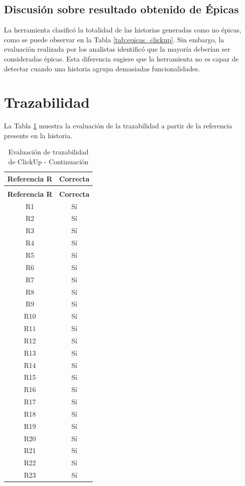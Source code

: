 \subsection{Discusión sobre resultado obtenido de Épicas}
La herramienta clasificó la totalidad de las historias generadas como no épicas, como se puede observar en la Tabla \ref{tab:epicas_clickup}. Sin embargo, la evaluación realizada por los analistas identificó que la mayoría deberían ser consideradas épicas. Esta diferencia sugiere que la herramienta no es capaz de detectar cuando una historia agrupa demasiadas funcionalidades.

\section{Trazabilidad}
La Tabla \ref{tab:trazabilidad_clickup} muestra la evaluación de la trazabilidad a partir de la referencia presente en la historia.

\begin{longtable}{|c|c|}
\caption{Evaluación de trazabilidad de ClickUp} 
\label{tab:trazabilidad_clickup} \\
\hline
\textbf{Referencia R} & \textbf{Correcta} \\
\hline
\endfirsthead
\caption{Evaluación de trazabilidad de ClickUp - Continuación} \\
\hline
\textbf{Referencia R} & \textbf{Correcta} \\
\hline
\endhead
\hline
\endfoot
\hline
\endlastfoot
R1 & Sí \\
\hline
R2 & Sí \\
\hline
R3 & Sí \\
\hline
R4 & Sí \\
\hline
R5 & Sí \\
\hline
R6 & Sí \\
\hline
R7 & Sí \\
\hline
R8 & Sí \\
\hline
R9 & Sí \\
\hline
R10 & Sí \\
\hline
R11 & Sí \\
\hline
R12 & Sí \\
\hline
R13 & Sí \\
\hline
R14 & Sí \\
\hline
R15 & Sí \\
\hline
R16 & Sí \\
\hline
R17 & Sí \\
\hline
R18 & Sí \\
\hline
R19 & Sí \\
\hline
R20 & Sí \\
\hline
R21 & Sí \\
\hline
R22 & Sí \\
\hline
R23 & Sí \\
\hline
\end{longtable}

